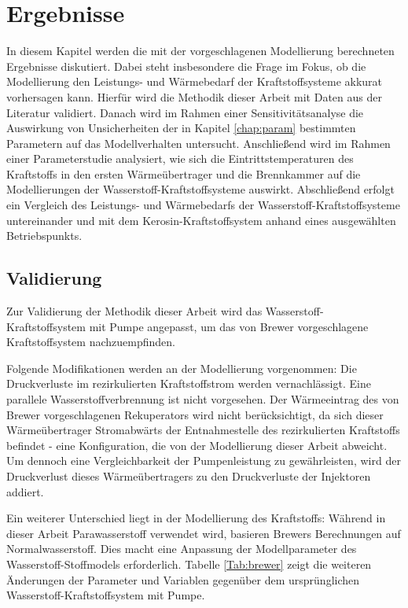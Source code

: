 \chapter{Ergebnisse} \label{chap:ergebnis}

In diesem Kapitel werden die mit der vorgeschlagenen Modellierung berechneten Ergebnisse diskutiert. Dabei steht insbesondere die Frage im Fokus, ob die Modellierung den Leistungs- und Wärmebedarf der Kraftstoffsysteme akkurat vorhersagen kann. Hierfür wird die Methodik dieser Arbeit mit Daten aus der Literatur validiert. Danach wird im Rahmen einer Sensitivitätsanalyse die Auswirkung von Unsicherheiten der in Kapitel \ref{chap:param} bestimmten Parametern auf das Modellverhalten untersucht. Anschließend wird im Rahmen einer Parameterstudie analysiert, wie sich die Eintrittstemperaturen des Kraftstoffs in den ersten Wärmeübertrager und die Brennkammer auf die Modellierungen der Wasserstoff-Kraftstoffsysteme auswirkt. Abschließend erfolgt ein Vergleich des Leistungs- und Wärmebedarfs der Wasserstoff-Kraftstoffsysteme untereinander und mit dem Kerosin-Kraftstoffsystem anhand eines ausgewählten Betriebspunkts.

\section{Validierung}

Zur Validierung der Methodik dieser Arbeit wird das Wasserstoff-Kraftstoffsystem mit Pumpe angepasst, um das von Brewer \cite{Brewer.1991} vorgeschlagene Kraftstoffsystem nachzuempfinden. 

Folgende Modifikationen werden an der Modellierung vorgenommen: Die Druckverluste im rezirkulierten Kraftstoffstrom werden vernachlässigt. Eine parallele Wasserstoffverbrennung ist nicht vorgesehen. Der Wärmeeintrag des von Brewer vorgeschlagenen Rekuperators wird nicht berücksichtigt, da sich dieser Wärmeübertrager Stromabwärts der Entnahmestelle des rezirkulierten Kraftstoffs befindet - eine Konfiguration, die von der Modellierung dieser Arbeit abweicht. Um dennoch eine Vergleichbarkeit der Pumpenleistung zu gewährleisten, wird der Druckverlust dieses Wärmeübertragers zu den Druckverluste der Injektoren addiert. 

Ein weiterer Unterschied liegt in der Modellierung des Kraftstoffs: Während in dieser Arbeit Parawasserstoff verwendet wird, basieren Brewers Berechnungen auf Normalwasserstoff. Dies macht eine Anpassung der Modellparameter des Wasserstoff-Stoffmodels erforderlich. Tabelle \ref{Tab:brewer} zeigt die weiteren Änderungen der Parameter und Variablen gegenüber dem ursprünglichen Wasserstoff-Kraftstoffsystem mit Pumpe.

